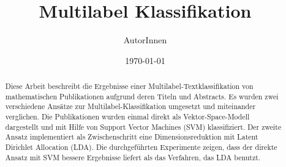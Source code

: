 \documentclass{scrartcl}
\title{Multilabel Klassifikation}
\author{AutorInnen}
\date{\today}
\begin{document}
\maketitle

\begin{abstract}
    Diese Arbeit beschreibt die Ergebnisse einer Multilabel-Textklassifikation von mathematischen Publikationen aufgrund deren Titeln und Abstracts.
    Es wurden zwei verschiedene Ansätze zur Multilabel-Klassifikation umgesetzt und miteinander verglichen.
    Die Publikationen wurden einmal direkt als Vektor-Space-Modell dargestellt und mit Hilfe von Support Vector Machines (SVM) klassifiziert.
    Der zweite Ansatz implementiert als Zwischenschritt eine Dimensionsreduktion mit Latent Dirichlet Allocation (LDA).
    Die durchgeführten Experimente zeigen, dass der direkte Ansatz mit SVM bessere Ergebnisse liefert als das Verfahren, das LDA benutzt.
\end{abstract}

\tableofcontents
\newpage



%





\nocite{*}
\newpage


\end{document}
